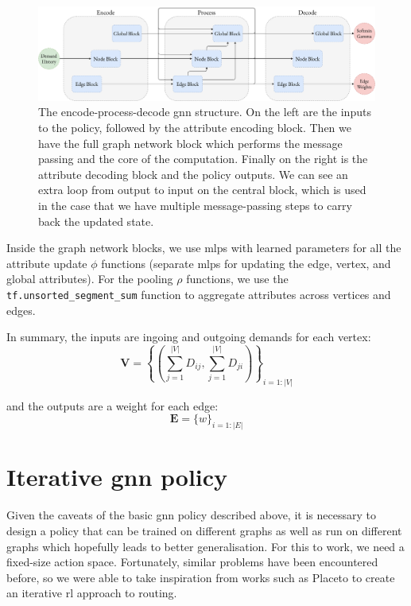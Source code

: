 \begin{figure}
    \centering
    \includegraphics[width=\textwidth]{figures/encode_process_decode.pdf}
    \caption{The encode-process-decode \ac{gnn} structure. On the left are the inputs to the policy, followed by the attribute encoding block. Then we have the full graph network block which performs the message passing and the core of the computation. Finally on the right is the attribute decoding block and the policy outputs. We can see an extra loop from output to input on the central block, which is used in the case that we have multiple message-passing steps to carry back the updated state.}
    \label{fig:encode_process_decode}
\end{figure}

Inside the graph network blocks, we use \acp{mlp} with learned parameters for all the attribute update $\phi$ functions (separate \acp{mlp} for updating the edge, vertex, and global attributes). For the pooling $\rho$ functions, we use the \texttt{tf.unsorted\_segment\_sum} function to aggregate attributes across vertices and edges.

In summary, the inputs are ingoing and outgoing demands for each vertex:
\begin{equation}
  \label{equation:node_inputs}
  \bm{V} = \left\{\left(\sum_{j=1}^{|V|}{D_{ij}}, \sum_{j=1}^{|V|}{D_{ji}}\right)\right\}_{i=1:|V|}
\end{equation}

and the outputs are a weight for each edge:
\begin{equation}
  \label{equation:edge_outputs}
  \bm{E} = \{w\}_{i=1:|E|}
\end{equation}


\section{Iterative \acs{gnn} policy}
\label{section:gnn_iterative}
Given the caveats of the basic \ac{gnn} policy described above, it is necessary to design a policy that can be trained on different graphs as well as run on different graphs which hopefully leads to better generalisation. For this to work, we need a fixed-size action space. Fortunately, similar problems have been encountered before, so we were able to take inspiration from works such as Placeto\cite{venkatakrishnan2019learning} to create an iterative \ac{rl} approach to routing.

